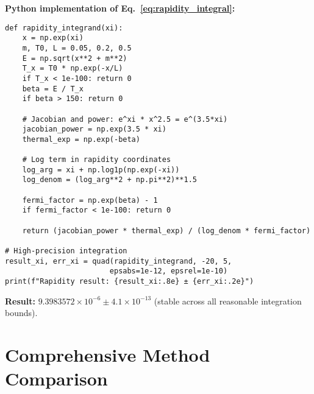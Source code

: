\documentclass[12pt]{article}
\begin{document}
\textbf{Python implementation of Eq.~\eqref{eq:rapidity_integral}:}
\begin{verbatim}
def rapidity_integrand(xi):
    x = np.exp(xi)
    m, T0, L = 0.05, 0.2, 0.5
    E = np.sqrt(x**2 + m**2)
    T_x = T0 * np.exp(-x/L)
    if T_x < 1e-100: return 0
    beta = E / T_x
    if beta > 150: return 0
    
    # Jacobian and power: e^xi * x^2.5 = e^(3.5*xi)
    jacobian_power = np.exp(3.5 * xi)
    thermal_exp = np.exp(-beta)
    
    # Log term in rapidity coordinates
    log_arg = xi + np.log1p(np.exp(-xi))
    log_denom = (log_arg**2 + np.pi**2)**1.5
    
    fermi_factor = np.exp(beta) - 1
    if fermi_factor < 1e-100: return 0
    
    return (jacobian_power * thermal_exp) / (log_denom * fermi_factor)

# High-precision integration
result_xi, err_xi = quad(rapidity_integrand, -20, 5, 
                        epsabs=1e-12, epsrel=1e-10)
print(f"Rapidity result: {result_xi:.8e} ± {err_xi:.2e}")
\end{verbatim}

\textbf{Result:} $9.3983572 \times 10^{-6} \pm 4.1 \times 10^{-13}$ (stable across all reasonable integration bounds).

\section{Comprehensive Method Comparison}
\end{document}
